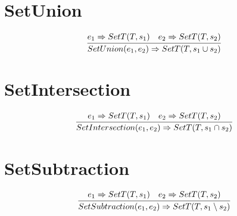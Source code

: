 \documentclass{article}
\begin{document}
\section*{SetUnion}
\begin{equation*}
	\infer{SetUnion(e_1, e_2) \Rightarrow SetT(T, s_1 \cup s_2)}{e_1 \Rightarrow SetT(T, s_1) & e_2 \Rightarrow SetT(T, s_2)}
\end{equation*}
\section*{SetIntersection}
\begin{equation*}
	\infer{SetIntersection(e_1, e_2) \Rightarrow SetT(T, s_1 \cap s_2)}{e_1 \Rightarrow SetT(T, s_1) & e_2 \Rightarrow SetT(T, s_2)}
\end{equation*}
\section*{SetSubtraction}
\begin{equation*}
	\infer{SetSubtraction(e_1, e_2) \Rightarrow SetT(T, s_1 \setminus s_2)}{e_1 \Rightarrow SetT(T, s_1) & e_2 \Rightarrow SetT(T, s_2)}
\end{equation*}
\end{document}
